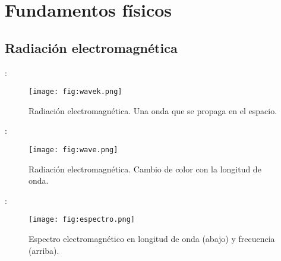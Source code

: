 \section{Fundamentos físicos}


\subsection{Radiación electromagnética}
\begin{frame}{\secname : \subsecname}
  \begin{figure}
    \centering
    \texttt{[image: fig:wavek.png]}
    \caption{Radiación electromagnética. Una onda que se propaga en el espacio.}
    \label{}
  \end{figure}
\end{frame}

\begin{frame}{\secname : \subsecname}
  \begin{figure}
    \centering
    \texttt{[image: fig:wave.png]}
    \caption{Radiación electromagnética. Cambio de color con la longitud de onda.}
    \label{}
  \end{figure}
\end{frame}

\begin{frame}{\secname : \subsecname}
  \begin{figure}
    \centering
    \texttt{[image: fig:espectro.png]}
    \caption{Espectro electromagnético en longitud de onda (abajo) y frecuencia (arriba).}
    \label{}
  \end{figure}
\end{frame}


